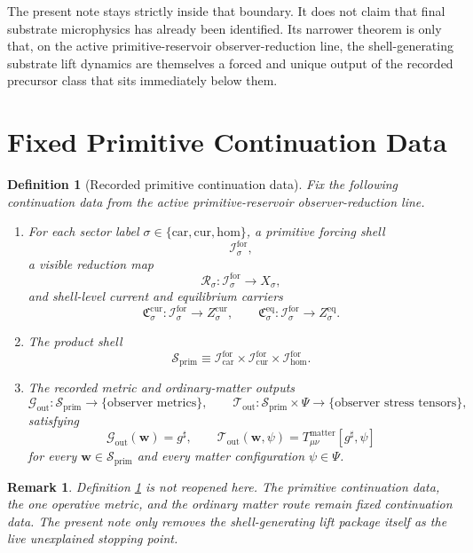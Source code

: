 \documentclass[11pt]{article}
\newcommand{\CompletedMetric}{g^{\sharp}}
\newcommand{\Car}{\mathrm{car}}
\newcommand{\Cur}{\mathrm{cur}}
\newcommand{\Hom}{\mathrm{hom}}
\newcommand{\ForSpace}[1]{\mathcal I_{#1}^{\mathrm{for}}}
\newcommand{\PrimShell}{\mathcal S_{\mathrm{prim}}}
\newcommand{\Reduction}[1]{\mathcal R_{#1}}
\newcommand{\CurrentCarrier}[1]{\mathfrak C_{#1}^{\mathrm{cur}}}
\newcommand{\EqCarrier}[1]{\mathfrak C_{#1}^{\mathrm{eq}}}
\newcommand{\MetricOut}{\mathscr G_{\mathrm{out}}}
\newcommand{\MatterOut}{\mathscr T_{\mathrm{out}}}
\newtheorem{definition}{Definition}
\newtheorem{remark}{Remark}
\begin{document}
The present note stays strictly inside that boundary. It does not claim that final substrate microphysics has already been identified. Its narrower theorem is only that, on the active primitive-reservoir observer-reduction line, the shell-generating substrate lift dynamics are themselves a forced and unique output of the recorded precursor class that sits immediately below them.

\section{Fixed Primitive Continuation Data}

\begin{definition}[Recorded primitive continuation data]
\label{def:fixed}
Fix the following continuation data from the active primitive-reservoir observer-reduction line.
\begin{enumerate}
    \item For each sector label \(\sigma\in\{\Car,\Cur,\Hom\}\), a primitive forcing shell
    \[
    \ForSpace{\sigma},
    \]
    a visible reduction map
    \[
    \Reduction{\sigma}:\ForSpace{\sigma}\to X_{\sigma},
    \]
    and shell-level current and equilibrium carriers
    \[
    \CurrentCarrier{\sigma}:\ForSpace{\sigma}\to Z_{\sigma}^{\mathrm{cur}},
    \qquad
    \EqCarrier{\sigma}:\ForSpace{\sigma}\to Z_{\sigma}^{\mathrm{eq}}.
    \]
    \item The product shell
    \[
    \PrimShell
    \equiv
    \ForSpace{\Car}\times \ForSpace{\Cur}\times \ForSpace{\Hom}.
    \]
    \item The recorded metric and ordinary-matter outputs
    \[
    \MetricOut:\PrimShell\to\{\text{observer metrics}\},
    \qquad
    \MatterOut:\PrimShell\times\Psi\to\{\text{observer stress tensors}\},
    \]
    satisfying
    \begin{equation}
    \MetricOut(\mathbf w)=\CompletedMetric,
    \qquad
    \MatterOut(\mathbf w,\psi)
    =
    T_{\mu\nu}^{\mathrm{matter}}[\CompletedMetric,\psi]
    \label{eq:fixedoutputs}
    \end{equation}
    for every \(\mathbf w\in\PrimShell\) and every matter configuration \(\psi\in\Psi\).
\end{enumerate}
\end{definition}

\begin{remark}
Definition \ref{def:fixed} is not reopened here. The primitive continuation data, the one operative metric, and the ordinary matter route remain fixed continuation data. The present note only removes the shell-generating lift package itself as the live unexplained stopping point.
\end{remark}
\end{document}
